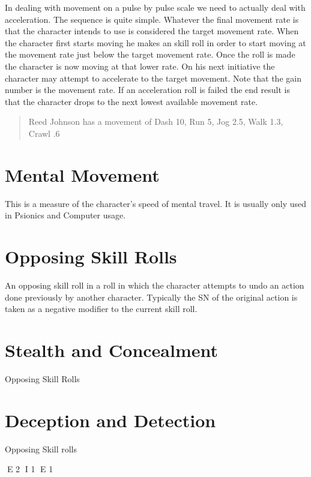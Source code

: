 In dealing with movement on a pulse by pulse scale we need to actually
deal with acceleration. The sequence is quite simple. Whatever the
final movement  rate is that the character intends to use is considered
the target movement rate. When the character first starts moving he
makes an skill roll in order to start moving at the movement
rate just below the target movement rate. Once the roll is made the
character is now moving at that lower rate. On his next  initiative the
character may attempt to accelerate to the target movement. Note  that
the gain number is the movement rate. If an acceleration roll is failed
the end result is that the character drops to the next lowest available
movement  rate. 

\begin{quotation}
Reed Johnson has a movement of Dash 10, Run 5, Jog 2.5, Walk 1.3, Crawl .6
\end{quotation}



\section{Mental Movement}
This is a measure of the character's speed of mental travel. It is 
usually only used in Psionics and Computer usage.

\section{Opposing Skill Rolls}

An opposing skill roll in a roll in which the character attempts to 
undo an action done previously by another character. Typically the SN 
of the original action is taken as a negative modifier to the current 
skill roll.

\section{Stealth and Concealment}

Opposing Skill Rolls

\section{Deception and Detection}

Opposing Skill rolls



E 2
I 1
E 1
